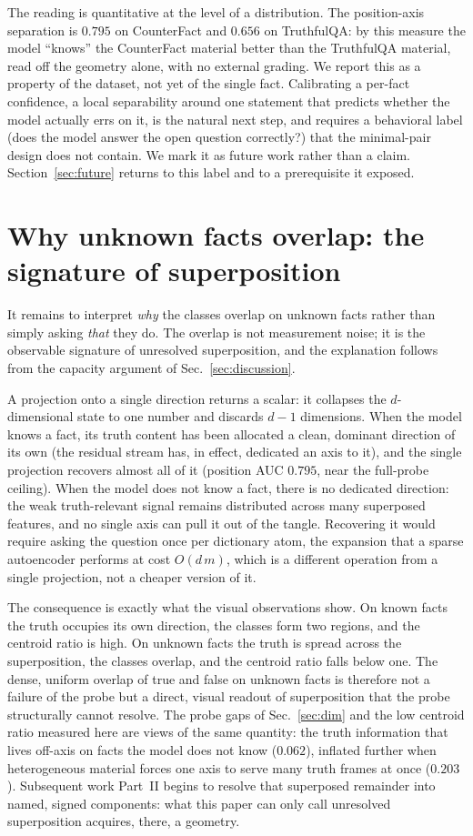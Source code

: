 \documentclass[11pt]{article}
\begin{document}
The reading is quantitative at the level of a distribution. The position-axis
separation is $0.795$ on CounterFact and $0.656$ on TruthfulQA: by this
measure the model ``knows'' the CounterFact material better than the
TruthfulQA material, read off the geometry alone, with no external grading.
We report this as a property of the dataset, not yet of the single fact.
Calibrating a per-fact confidence, a local separability around one statement
that predicts whether the model actually errs on it, is the natural next
step, and requires a behavioral label (does the model answer the open
question correctly?) that the minimal-pair design does not contain. We mark
it as future work rather than a claim. Section~\ref{sec:future} returns to
this label and to a prerequisite it exposed.

\section{Why unknown facts overlap: the signature of superposition}
\label{sec:why}

It remains to interpret \emph{why} the classes overlap on unknown facts
rather than simply asking \emph{that} they do. The overlap is not measurement
noise; it is the observable signature of unresolved superposition, and the
explanation follows from the capacity argument of Sec.~\ref{sec:discussion}.

A projection onto a single direction returns a scalar: it collapses the
$d$-dimensional state to one number and discards $d - 1$ dimensions. When the
model knows a fact, its truth content has been allocated a clean, dominant
direction of its own (the residual stream has, in effect, dedicated an axis
to it), and the single projection recovers almost all of it (position AUC
$0.795$, near the full-probe ceiling). When the model does not know a fact,
there is no dedicated direction: the weak truth-relevant signal remains
distributed across many superposed features, and no single axis can pull it
out of the tangle. Recovering it would require asking the question once per
dictionary atom, the expansion that a sparse autoencoder performs at cost
$O(d\,m)$, which is a different operation from a single projection, not a
cheaper version of it.

The consequence is exactly what the visual observations show. On known facts
the truth occupies its own direction, the classes form two regions, and the
centroid ratio is high. On unknown facts the truth is spread across the
superposition, the classes overlap, and the centroid ratio falls below one.
The dense, uniform overlap of true and false on unknown facts is therefore
not a failure of the probe but a direct, visual readout of superposition that
the probe structurally cannot resolve. The probe gaps of
Sec.~\ref{sec:dim} and the low centroid ratio measured here are views of the
same quantity: the truth information that lives off-axis on facts the model
does not know ($0.062$), inflated further when heterogeneous material forces
one axis to serve many truth frames at once ($0.203$). Subsequent work
Part~II begins to resolve that superposed
remainder into named, signed components: what this paper can only call
unresolved superposition acquires, there, a geometry.
\end{document}
